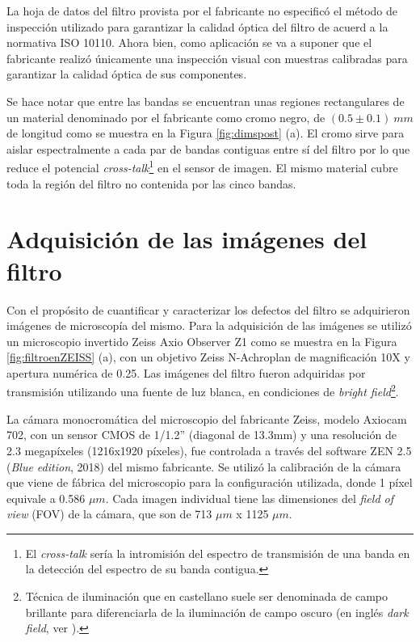La hoja de datos del filtro provista por el fabricante no especificó el método de inspección utilizado para garantizar la calidad óptica del filtro de acuerd a la normativa ISO 10110. Ahora bien, como aplicación se va a suponer que el fabricante realizó únicamente una inspección visual con muestras calibradas para garantizar la calidad óptica de sus componentes.

Se hace notar que entre las bandas se encuentran unas regiones rectangulares de un material denominado por el fabricante como cromo negro, de $(0.5 \pm 0.1)~mm $ de longitud como se muestra en la Figura \ref{fig:dimspost} (a). El cromo sirve para aislar espectralmente a cada par de bandas contiguas entre sí del filtro por lo que reduce el potencial \textit{cross-talk}\footnote{El \textit{cross-talk} sería la intromisión del espectro de transmisión de una banda en la detección del espectro de su banda contigua.} en el sensor de imagen. El mismo material cubre toda la región del filtro no contenida por las cinco bandas. 

\singlespacing
\section{Adquisición de las imágenes del filtro}
\label{sec:conf}

\hspace{0.5cm}Con el propósito de cuantificar y caracterizar los defectos del filtro se adquirieron imágenes de microscopía del mismo. Para la adquisición de las imágenes se utilizó un microscopio invertido Zeiss Axio Observer Z1 como se muestra en la Figura \ref{fig:filtroenZEISS} (a), con un objetivo Zeiss N-Achroplan de magnificación 10X y apertura numérica de 0.25. Las imágenes del filtro fueron adquiridas por transmisión utilizando una fuente de luz blanca, en condiciones de \textit{bright field}\footnote{Técnica de iluminación que en castellano suele ser denominada de campo brillante para diferenciarla de la iluminación de campo oscuro (en inglés \textit{dark field}, ver \cite{wikiosc}).}.

La cámara monocromática del microscopio del fabricante Zeiss, modelo Axiocam 702, con un sensor CMOS de 1/1.2'' (diagonal de 13.3mm) y una resolución de 2.3 megapíxeles (1216x1920 píxeles), fue controlada a través del software ZEN 2.5 (\textit{Blue edition}, 2018) del mismo fabricante. Se utilizó la calibración de la cámara que viene de fábrica del microscopio para la configuración utilizada, donde 1 píxel equivale a 0.586 $\mu m$.  Cada imagen individual tiene las dimensiones del \textit{field of view} (FOV) de la cámara, que son de 713 $\mu m$ x 1125 $\mu m$. 


